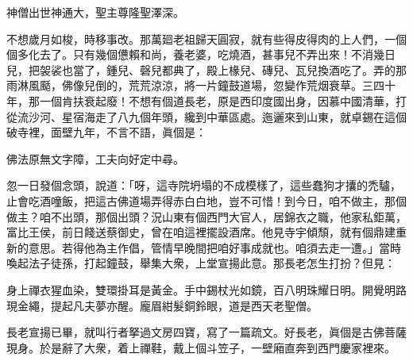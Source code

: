 \begin{myquote}
神僧出世神通大，聖主尊隆聖澤深。
\end{myquote}

不想歲月如梭，時移事改。那萬廻老祖歸天圓寂，就有些得皮得肉的上人們，一個個多化去了。只有幾個憊賴和尚，養老婆，吃燒酒，{}甚事兒不弄出來！不消幾日兒，把袈裟也當了，鍾兒、磬兒都典了，殿上椽兒、磚兒、瓦兒換酒吃了。弄的那雨淋風颳，佛像兒倒的，荒荒涼涼，將一片鐘鼓道場，忽變作荒烟衰草。三四十年，那一個肯扶衰起廢！不想有個道長老，原是西印度國出身，因慕中國清華，打從流沙河、星宿海走了八九個年頭，纔到中華區處。迤邐來到山東，就卓錫在這個破寺裡，面壁九年，不言不語，{}眞個是：

\begin{myquote}
佛法原無文字障，工夫向好定中尋。
\end{myquote}

忽一日發個念頭，說道：「呀，這寺院坍塌的不成模樣了，這些蠢狗才攮的禿驢，止會吃酒噇飯，把這古佛道場弄得赤白白地，豈不可惜！到今日，咱不做主，那個做主？咱不出頭，那個出頭？況山東有個西門大官人，居錦衣之職，他家私鉅萬，富比王侯，前日餞送蔡御史，曾在咱這裡擺設酒席。他見寺宇傾頹，就有個鼎建重新的意思。若得他為主作倡，管情早晚間把咱好事成就也。咱須去走一遭。」當時喚起法子徒孫，打起鐘鼓，舉集大衆，上堂宣揚此意。那長老怎生打扮？但見：

\begin{myquote}
身上禪衣猩血染，雙環掛耳是黃金。手中錫杖光如鏡，百八明珠耀日明。開覺明路現金繩，提起凡夫夢亦醒。龐眉紺髮銅鈴眼，道是西天老聖僧。
\end{myquote}

長老宣揚已畢，就叫行者拏過文房四寶，寫了一篇疏文。好長老，眞個是古佛菩薩現身。於是辭了大衆，着上禪鞋，戴上個斗笠子，一壁廂直奔到西門慶家裡來。


